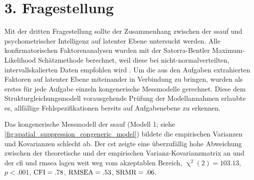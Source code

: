 \documentclass[11pt, twoside, a4paper]{book}		%
\begin{document}
















\clearpage
\section{3. Fragestellung \label{sec:3Fragestellung}}

Mit der dritten Fragestellung sollte der Zusammenhang zwischen der \gls{ssauf} und psychometrischer Intelligenz auf latenter Ebene untersucht werden. 
Alle konfirmatorischen Faktorenanalysen wurden mit der Satorra-Bentler Maximum-Likelihood Schätzmethode \citep{Satorra1994} berechnet, weil diese bei nicht-normal\-ver\-teilten, intervallskalierten Daten empfohlen wird \citep[z.B.][]{Curran1996, Finney2006}.
Um die aus den Aufgaben extrahierten Faktoren auf latenter Ebene miteinander in Verbindung zu bringen, wurden als erstes für jede Aufgabe einzeln kongenerische Messmodelle \citep{Joereskog1971} gerechnet. Diese dem Strukturgleichungsmodell vorausgehende Prüfung der Modellannahmen erlaubte es, allfällige Fehlspezifikationen bereits auf Aufgabenebene zu erkennen.

Das kongenerische Messmodell der \gls{ssauf} (Modell 1; siehe \autoref{fig:spatial_suppression_congeneric_model}) bildete die empirischen Varianzen und Kovarianzen schlecht ab.  Der \gls{cst} zeigte eine überzufällig hohe Abweichung zwischen der theoretische und der empirischen Var\-ianz-Ko\-var\-ianz\-ma\-trix an und der \gls{cfi} und \gls{rmsea} lagen weit weg vom akzeptablen Bereich, $\upchi^2(2)=103.13$, $p<.001$, $\textnormal{CFI}=.78$, $\textnormal{RMSEA}=.53$, $\textnormal{SRMR}=.06$.
\end{document}
